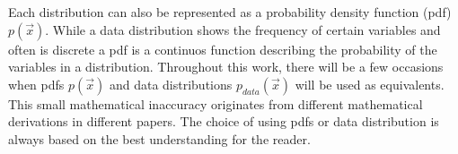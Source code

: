 Each distribution can also be represented as a probability density function (pdf) $p(\vec{x})$. While a data distribution shows the frequency of certain variables and often is discrete a pdf is a continuos function describing the probability of the variables in a distribution. Throughout this work, there will be a few occasions when pdfs $p(\vec{x})$ and data distributions $p_{data}(\vec{x})$ will be used as equivalents. This small mathematical inaccuracy originates from different mathematical derivations in different papers. The choice of using pdfs or data distribution is always based on the best understanding for the reader.